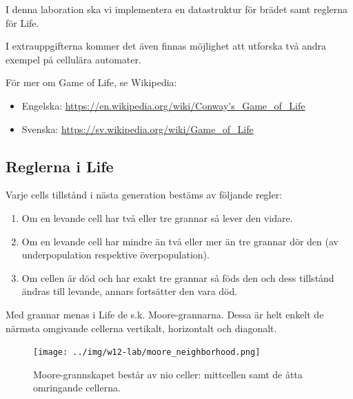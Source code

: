 \vspace{5mm}

I denna laboration ska vi implementera en datastruktur för brädet samt reglerna för Life.

I extrauppgifterna kommer det även finnas möjlighet att utforska två andra exempel på cellulära automater.

\vspace{5mm}

För mer om Game of Life, se Wikipedia:

\begin{itemize}[noitemsep,topsep=0pt]
    	\item Engelska: \url{https://en.wikipedia.org/wiki/Conway's_Game_of_Life}
    	\item Svenska: \url{https://sv.wikipedia.org/wiki/Game_of_Life}
\end{itemize}


\subsection{Reglerna i Life}
\label{subsec:life-rules}

Varje cells tillstånd i nästa generation bestäms av följande regler:
\begin{enumerate}
    \item Om en levande cell har två eller tre grannar så lever den vidare.
    \item Om en levande cell har mindre än två eller mer än tre grannar dör den (av underpopulation respektive överpopulation).
    \item Om cellen är död och har exakt tre grannar så föds den och dess tillstånd ändras till levande, annars fortsätter den vara död.
\end{enumerate}

Med grannar menas i Life de s.k. Moore-grannarna. Dessa är helt enkelt de närmsta omgivande cellerna vertikalt, horizontalt och diagonalt.

\begin{figure}[h]
  \begin{center}
    \texttt{[image: ../img/w12-lab/moore\_neighborhood.png]}
  \end{center}
  \caption{Moore-grannskapet består av nio celler: mittcellen samt de åtta omringande cellerna.\protect\footnotemark}
  \label{fig:threads:life:moore-neighborhood}
\end{figure}


